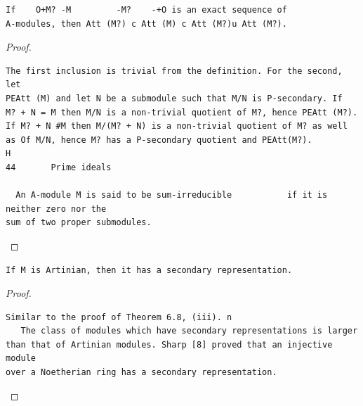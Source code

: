 \begin{theorem}\label{mcrt-auto-theorem-6-10}\uses{}
\begin{verbatim}
If    O+M? -M         -M?    -+O is an exact sequence of
A-modules, then Att (M?) c Att (M) c Att (M?)u Att (M?).
\end{verbatim}
\end{theorem}
\begin{proof}
\begin{verbatim}
The first inclusion is trivial from the definition. For the second, let
PEAtt (M) and let N be a submodule such that M/N is P-secondary. If
M? + N = M then M/N is a non-trivial quotient of M?, hence PEAtt (M?).
If M? + N #M then M/(M? + N) is a non-trivial quotient of M? as well
as Of M/N, hence M? has a P-secondary quotient and PEAtt(M?).             H
44       Prime ideals

  An A-module M is said to be sum-irreducible           if it is neither zero nor the
sum of two proper submodules.
\end{verbatim}
\end{proof}


\begin{theorem}\label{mcrt-auto-theorem-6-11}\uses{}
\begin{verbatim}
If M is Artinian, then it has a secondary representation.
\end{verbatim}
\end{theorem}
\begin{proof}
\begin{verbatim}
Similar to the proof of Theorem 6.8, (iii). n
   The class of modules which have secondary representations is larger
than that of Artinian modules. Sharp [8] proved that an injective module
over a Noetherian ring has a secondary representation.
\end{verbatim}
\end{proof}


